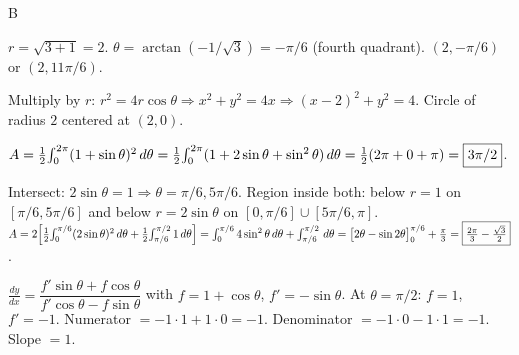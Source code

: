 \documentclass[11pt]{article}
\begin{document}
\begin{answers}{B}
\item $r = \sqrt{3 + 1} = 2$. $\theta = \arctan(-1/\sqrt 3) = -\pi/6$ (fourth quadrant). $\boxed{(2, -\pi/6)}$ or $(2, 11\pi/6)$.
\item Multiply by $r$: $r^2 = 4 r\cos\theta \Rightarrow x^2 + y^2 = 4x \Rightarrow \boxed{(x-2)^2 + y^2 = 4}$. Circle of radius $2$ centered at $(2,0)$.
\item $A = \tfrac{1}{2}\!\int_0^{2\pi}(1 + \sin\theta)^2 \,d\theta = \tfrac{1}{2}\!\int_0^{2\pi}(1 + 2\sin\theta + \sin^2\theta)\,d\theta = \tfrac{1}{2}(2\pi + 0 + \pi) = \boxed{3\pi/2}$.
\item Intersect: $2\sin\theta = 1 \Rightarrow \theta = \pi/6, 5\pi/6$. Region inside both: below $r=1$ on $[\pi/6, 5\pi/6]$ and below $r=2\sin\theta$ on $[0,\pi/6]\cup[5\pi/6,\pi]$.
$A = 2\!\left[\tfrac{1}{2}\!\int_0^{\pi/6}(2\sin\theta)^2\,d\theta + \tfrac{1}{2}\!\int_{\pi/6}^{\pi/2} 1 \,d\theta\right]
= \int_0^{\pi/6} 4\sin^2\theta\,d\theta + \int_{\pi/6}^{\pi/2}\,d\theta = \bigl[2\theta - \sin 2\theta\bigr]_0^{\pi/6} + \tfrac{\pi}{3} = \boxed{\tfrac{2\pi}{3} - \tfrac{\sqrt 3}{2}}$.
\item $\tfrac{dy}{dx} = \dfrac{f'\sin\theta + f\cos\theta}{f'\cos\theta - f\sin\theta}$ with $f = 1+\cos\theta$, $f' = -\sin\theta$. At $\theta = \pi/2$: $f = 1$, $f' = -1$. Numerator $= -1 \cdot 1 + 1 \cdot 0 = -1$. Denominator $= -1 \cdot 0 - 1 \cdot 1 = -1$. Slope $= \boxed{1}$.
\end{answers}
\end{document}
